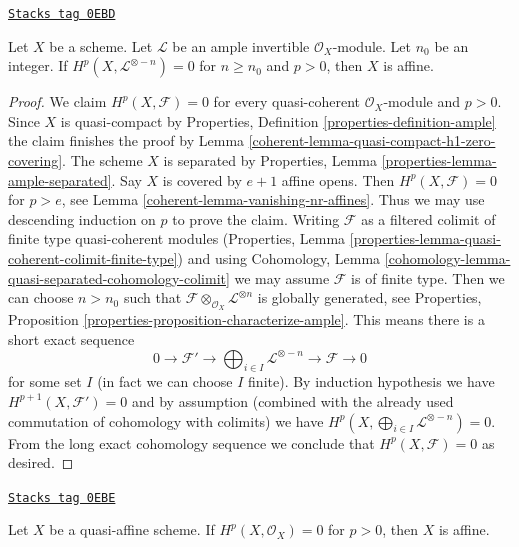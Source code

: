 \begin{lemma}
\label{coherent-lemma-affine-in-presence-ample}
\href{https://stacks.math.columbia.edu/tag/0EBD}{\texttt{Stacks tag 0EBD}}

Let $X$ be a scheme. Let $\mathcal{L}$ be an ample invertible
$\mathcal{O}_X$-module. Let $n_0$ be an integer.
If $H^p(X, \mathcal{L}^{\otimes -n}) = 0$ for $n \geq n_0$ and $p > 0$,
then $X$ is affine.
\end{lemma}

\begin{proof}

We claim $H^p(X, \mathcal{F}) = 0$ for every quasi-coherent
$\mathcal{O}_X$-module and $p > 0$. Since $X$ is quasi-compact
by Properties, Definition \ref{properties-definition-ample}
the claim finishes the proof
by Lemma \ref{coherent-lemma-quasi-compact-h1-zero-covering}.
The scheme $X$ is separated by
Properties, Lemma \ref{properties-lemma-ample-separated}.
Say $X$ is covered by $e + 1$ affine opens. Then
$H^p(X, \mathcal{F}) = 0$ for $p > e$, see
Lemma \ref{coherent-lemma-vanishing-nr-affines}. Thus we may use descending
induction on $p$ to prove the claim. Writing $\mathcal{F}$
as a filtered colimit of finite type quasi-coherent
modules (Properties, Lemma
\ref{properties-lemma-quasi-coherent-colimit-finite-type})
and using Cohomology, Lemma
\ref{cohomology-lemma-quasi-separated-cohomology-colimit}
we may assume $\mathcal{F}$ is of finite type.
Then we can choose $n > n_0$ such that
$\mathcal{F} \otimes_{\mathcal{O}_X} \mathcal{L}^{\otimes n}$
is globally generated, see Properties, Proposition
\ref{properties-proposition-characterize-ample}.
This means there is a short exact sequence
$$
0 \to \mathcal{F}' \to
\bigoplus\nolimits_{i \in I} \mathcal{L}^{\otimes -n}
\to \mathcal{F} \to 0
$$
for some set $I$ (in fact we can choose $I$ finite). By
induction hypothesis we have $H^{p + 1}(X, \mathcal{F}') = 0$
and by assumption (combined with the already used
commutation of cohomology with colimits)
we have $H^p(X, \bigoplus_{i \in I} \mathcal{L}^{\otimes -n}) = 0$.
From the long exact cohomology sequence we conclude that
$H^p(X, \mathcal{F}) = 0$ as desired.
\end{proof}

\begin{lemma}
\label{coherent-lemma-affine-if-quasi-affine}
\href{https://stacks.math.columbia.edu/tag/0EBE}{\texttt{Stacks tag 0EBE}}

Let $X$ be a quasi-affine scheme.
If $H^p(X, \mathcal{O}_X) = 0$ for $p > 0$,
then $X$ is affine.
\end{lemma}

